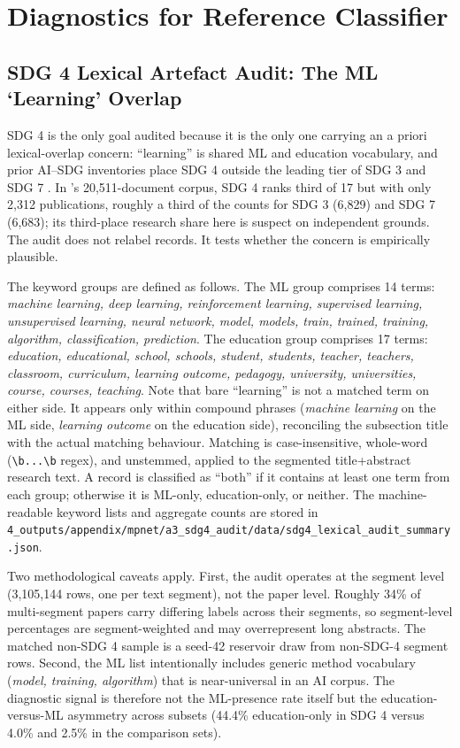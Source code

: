 \documentclass[12pt,a4paper]{article}
\let\OldSection\section
\renewcommand{\section}{\clearpage\FloatBarrier\OldSection}
\begin{document}
\section{Diagnostics for Reference Classifier}
\label{app:centroid-diagnostics}


\subsection{SDG 4 Lexical Artefact Audit: The ML `Learning' Overlap}
\label{app:sdg4-lexical-audit}

SDG 4 is the only goal audited because it is the only one carrying an a priori lexical-overlap concern: ``learning'' is shared ML and education vocabulary, and prior AI--SDG inventories place SDG 4 outside the leading tier of SDG 3 and SDG 7 \parencite{Singh2024, Cowls2021, Nedungadi2024}. In \textcite{Singh2024}'s 20,511-document corpus, SDG 4 ranks third of 17 but with only 2,312 publications, roughly a third of the counts for SDG 3 (6,829) and SDG 7 (6,683); its third-place research share here is suspect on independent grounds. The audit does not relabel records. It tests whether the concern is empirically plausible.

The keyword groups are defined as follows. The ML group comprises 14 terms: \emph{machine learning, deep learning, reinforcement learning, supervised learning, unsupervised learning, neural network, model, models, train, trained, training, algorithm, classification, prediction}. The education group comprises 17 terms: \emph{education, educational, school, schools, student, students, teacher, teachers, classroom, curriculum, learning outcome, pedagogy, university, universities, course, courses, teaching}. Note that bare ``learning'' is not a matched term on either side. It appears only within compound phrases (\emph{machine learning} on the ML side, \emph{learning outcome} on the education side), reconciling the subsection title with the actual matching behaviour. Matching is case-insensitive, whole-word (\verb|\b...\b| regex), and unstemmed, applied to the segmented title+abstract research text. A record is classified as ``both'' if it contains at least one term from each group; otherwise it is ML-only, education-only, or neither. The machine-readable keyword lists and aggregate counts are stored in \texttt{4\_outputs/appendix/mpnet/a3\_sdg4\_audit/data/sdg4\_lexical\_audit\_summary.json}.

Two methodological caveats apply. First, the audit operates at the segment level (3,105,144 rows, one per text segment), not the paper level. Roughly 34\% of multi-segment papers carry differing labels across their segments, so segment-level percentages are segment-weighted and may overrepresent long abstracts. The matched non-SDG 4 sample is a seed-42 reservoir draw from non-SDG-4 segment rows. Second, the ML list intentionally includes generic method vocabulary (\emph{model, training, algorithm}) that is near-universal in an AI corpus. The diagnostic signal is therefore not the ML-presence rate itself but the education-versus-ML asymmetry across subsets (44.4\% education-only in SDG 4 versus 4.0\% and 2.5\% in the comparison sets).
\end{document}

